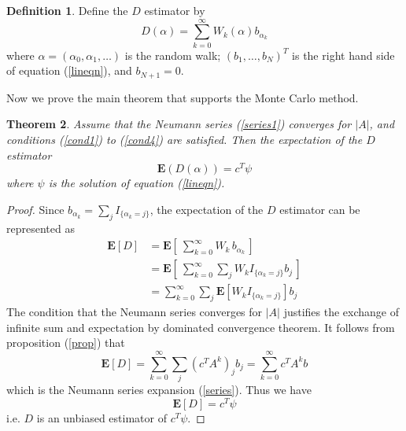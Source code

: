 \documentclass{elsart}
\newtheorem{theorem}{Theorem}[section]
\theoremstyle{remark}
\theoremstyle{definition}
\newtheorem{definition}[theorem]{Definition}
\theoremstyle{proof}
\newtheorem{proof}[theorem]{Proof}
\begin{document}
        \begin{definition}
            Define the $D$ estimator by
            \begin{equation} \label{D}
                D(\alpha) = \sum_{k=0}^\infty W_k(\alpha) b_{\alpha_k}
            \end{equation}
            where $\alpha = (\alpha_0,\alpha_1,\ldots)$ is the random walk;
            $(b_1,\ldots,b_N)^T$ is the right hand side of equation
            (\ref{lineqn}), and $b_{N+1} = 0$.
        \end{definition}
        Now we prove the main theorem that supports the Monte Carlo method.
        \begin{theorem} \label{mainthm}
            Assume that the Neumann series (\ref{series1}) converges for $|A|$,
            and conditions (\ref{cond1}) to (\ref{cond4}) are satisfied.
            Then the expectation of the $D$ estimator
            \[ \mathbf{E}( D(\alpha) ) = c^T \psi \]
            where $\psi$ is the solution of equation (\ref{lineqn}).
        \end{theorem}
        \begin{proof}
            Since $b_{\alpha_k} = \sum_j I_{\{\alpha_k=j\}}$, the expectation
            of the $D$ estimator can be represented as
            \[ \begin{split}
                \mathbf{E}[D] &=
                \mathbf{E}\left[ \: \sum_{k=0}^\infty W_k \, b_{\alpha_k}
                               \, \right] \\
                &= \mathbf{E}\left[ \: \sum_{k=0}^\infty
                                \sum_j W_k I_{\{\alpha_k=j\}} b_j \,\right] \\
                &= \sum_{k=0}^\infty \sum_j \mathbf{E}\left[ W_k
                                I_{\{\alpha_k=j\}} \right] b_j
            \end{split} \]
            The condition that the Neumann series converges for $|A|$ justifies
            the exchange of infinite sum and expectation by dominated
            convergence theorem.  It follows from proposition (\ref{prop}) that
            \[ \mathbf{E}[D] = \sum_{k=0}^\infty \sum_j (c^T A^k)_j b_j
                = \sum_{k=0}^\infty c^T A^k b
            \]
            which is the Neumann series expansion (\ref{series}). Thus we have
            \begin{equation}
                \mathbf{E}[D] = c^T \psi
            \end{equation}
            i.e. $D$ is an unbiased estimator of $c^T \psi$.
        \end{proof}
        
\end{document}
